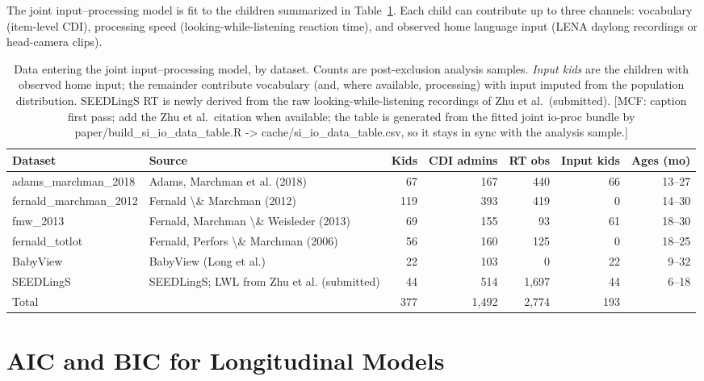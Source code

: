 \documentclass[
  11pt,
]{article}
\begin{document}
The joint input--processing model is fit to the children summarized in
Table~\ref{tbl-io-datasets}. Each child can contribute up to three
channels: vocabulary (item-level CDI), processing speed
(looking-while-listening reaction time), and observed home language
input (LENA daylong recordings or head-camera clips).

\begingroup\fontsize{9}{11}\selectfont

\begin{longtable}[t]{llrrrrr}

\caption{\label{tbl-io-datasets}Data entering the joint
input--processing model, by dataset. Counts are post-exclusion analysis
samples. \emph{Input kids} are the children with observed home input;
the remainder contribute vocabulary (and, where available, processing)
with input imputed from the population distribution. SEEDLingS RT is
newly derived from the raw looking-while-listening recordings of Zhu et
al.~(submitted). {[}MCF: caption first pass; add the Zhu et al.~citation
when available; the table is generated from the fitted joint io-proc
bundle by paper/build\_si\_io\_data\_table.R -\textgreater{}
cache/si\_io\_data\_table.csv, so it stays in sync with the analysis
sample.{]}}

\tabularnewline

\toprule
Dataset & Source & Kids & CDI admins & RT obs & Input kids & Ages (mo)\\
\midrule
adams\_marchman\_2018 & Adams, Marchman et al. (2018) & 67 & 167 & 440 & 66 & 13--27\\
fernald\_marchman\_2012 & Fernald \textbackslash{}\& Marchman (2012) & 119 & 393 & 419 & 0 & 14--30\\
fmw\_2013 & Fernald, Marchman \textbackslash{}\& Weisleder (2013) & 69 & 155 & 93 & 61 & 18--30\\
fernald\_totlot & Fernald, Perfors \textbackslash{}\& Marchman (2006) & 56 & 160 & 125 & 0 & 18--25\\
BabyView & BabyView (Long et al.) & 22 & 103 & 0 & 22 & 9--32\\
\addlinespace
SEEDLingS & SEEDLingS; LWL from Zhu et al. (submitted) & 44 & 514 & 1,697 & 44 & 6--18\\
\midrule
Total &  & 377 & 1,492 & 2,774 & 193 & \\
\bottomrule

\end{longtable}

\endgroup{}

\section{AIC and BIC for Longitudinal
Models}\label{aic-and-bic-for-longitudinal-models}
\end{document}
